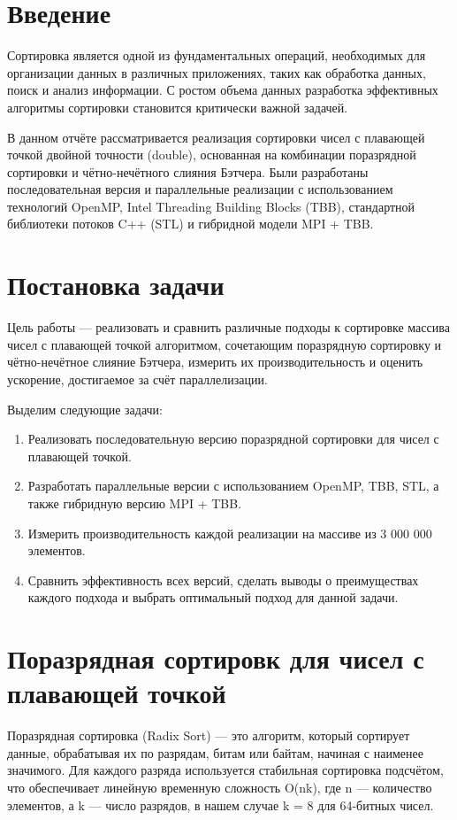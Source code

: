 \documentclass[12pt,a4paper]{extarticle}
\begin{document}
	\newpage
	
	
	\section*{Введение}
	Сортировка является одной из фундаментальных операций, необходимых для организации данных в различных приложениях, таких как обработка данных, поиск и анализ информации. С ростом объема данных разработка эффективных алгоритмы сортировки становится критически важной задачей. 

	В данном отчёте рассматривается реализация сортировки чисел с плавающей точкой двойной точности (double), основанная на комбинации поразрядной сортировки и чётно-нечётного слияния Бэтчера. Были разработаны последовательная версия и параллельные реализации с использованием технологий OpenMP, Intel Threading Building Blocks (TBB), стандартной библиотеки потоков C++ (STL) и гибридной модели MPI + TBB.
	
	\section*{Постановка задачи}	
	Цель работы — реализовать и сравнить различные подходы к сортировке массива чисел с плавающей точкой алгоритмом, сочетающим поразрядную сортировку и чётно-нечётное слияние Бэтчера, измерить их производительность и оценить ускорение, достигаемое за счёт параллелизации.
	
	Выделим следующие задачи:
		
	\begin{enumerate}
		\item Реализовать последовательную версию поразрядной сортировки для чисел с плавающей точкой.
		\item Разработать параллельные версии с использованием OpenMP, TBB, STL, а также гибридную версию MPI + TBB.
		\item Измерить производительность каждой реализации на массиве из 3 000 000 элементов.
		\item Сравнить эффективность всех версий, сделать выводы о преимуществах каждого подхода и выбрать оптимальный подход для данной задачи.
	\end{enumerate}
	
	\section{Поразрядная сортировк для чисел с плавающей точкой}
	
	Поразрядная сортировка (Radix Sort) — это алгоритм, который сортирует данные, обрабатывая их по разрядам, битам или байтам, начиная с наименее значимого. Для каждого разряда используется стабильная сортировка подсчётом, что обеспечивает линейную временную сложность O(nk), где n — количество элементов, а k — число разрядов, в нашем случае k = 8 для 64-битных чисел. 
	
\end{document}
